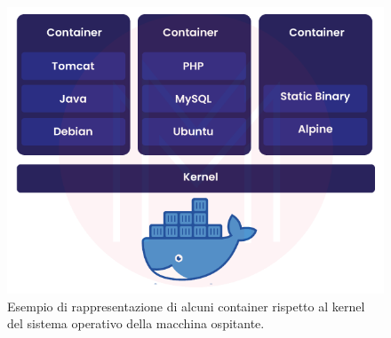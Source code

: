 \documentclass[a4paper,12pt]{report}
\begin{document}
\begin{figure}[h]
	\includegraphics[width=1.0\textwidth]{docker}
    \caption{Esempio di rappresentazione di alcuni container rispetto al kernel del sistema operativo della macchina ospitante. \cite{dockerimg}}
    \label{fig:docker}
\end{figure}
\end{document}
